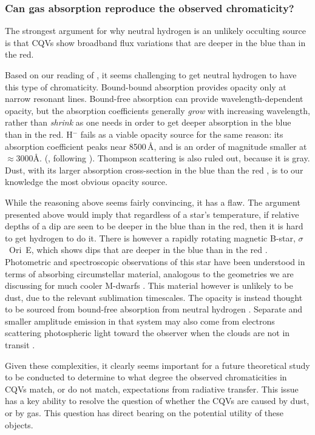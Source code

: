\documentclass[11pt,twocolumn,tighten]{aastex63}
\begin{document}
\subsubsection{Can gas absorption reproduce the observed chromaticity?}
The strongest argument for why neutral hydrogen is an unlikely
occulting source is that CQVs show broadband flux variations that are
deeper in the blue than in the red.

Based on our reading of \citet[][Ch.~8]{1992oasp.book.....G}, it seems
challenging to get neutral hydrogen to have this type of
chromaticity.  Bound-bound absorption provides opacity only at narrow
resonant lines.  Bound-free absorption can provide
wavelength-dependent opacity, but the absorption coefficients
generally {\it grow} with increasing wavelength, rather than {\it
shrink} as one needs in order to get deeper absorption in the blue
than in the red.  H$^-$  fails as a viable opacity source for the same
reason: its absorption coefficient peaks near 8500\,\AA, and is an
order of magnitude smaller at $\approx$3000\AA.
(\citealt{1992oasp.book.....G}, following \citealt{1979MNRAS.187P..59W}).
Thompson scattering is also ruled out, because it is gray.  Dust, with
its larger absorption cross-section in the blue than the red
\citep{1989ApJ...345..245C}, is to our knowledge the most obvious
opacity source.

While the reasoning above seems fairly convincing, it has a
flaw.  The argument presented above would imply that regardless of a
star's temperature, if relative depths of a dip are seen to be deeper
in the blue than in the red, then it is hard to get hydrogen to do it.
There is however a rapidly rotating magnetic B-star, $\sigma$~Ori~E,
which shows dips that are deeper in the blue than in the red
\citep{1977ApJ...216L..31H}.  Photometric and spectroscopic
observations of this star have been understood in terms of absorbing
circumstellar material, analogous to the geometries we are
discussing for much cooler M-dwarfs \citep{2005ApJ...630L..81T}.  This
material however is unlikely to be dust, due to the relevant sublimation
timescales.  The opacity is instead thought to be sourced from bound-free
absorption from neutral hydrogen \citep{2005ApJ...630L..81T}.
Separate and smaller amplitude emission in that system may also come
from electrons scattering photospheric light toward the observer when
the clouds are not in transit \citep{2022MNRAS.511.4815B}.

Given these complexities, it clearly seems important for a future
theoretical study to be conducted to determine to what degree the
observed chromaticities in CQVs match, or do not match, expectations
from radiative transfer.  This issue has a key ability to resolve the
question of whether the CQVs are caused by dust, or by gas.  This
question has direct bearing on the potential utility of these objects.
\end{document}
